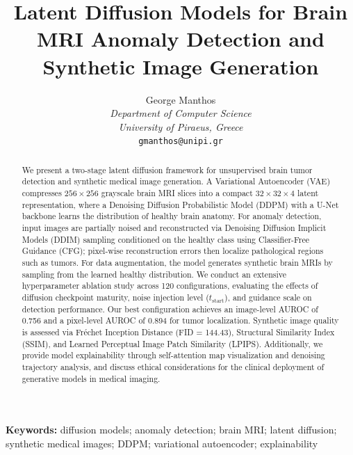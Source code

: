 \documentclass[12pt,a4paper]{article}
\title{\textbf{Latent Diffusion Models for Brain MRI Anomaly Detection and Synthetic Image Generation}}
\author{
  George Manthos \\
  \textit{Department of Computer Science} \\
  \textit{University of Piraeus, Greece} \\
  \texttt{gmanthos@unipi.gr}
}
\date{}
\begin{document}
\maketitle

\begin{abstract}
\noindent
We present a two-stage latent diffusion framework for unsupervised brain tumor detection and synthetic medical image generation. A Variational Autoencoder (VAE) compresses $256 \times 256$ grayscale brain MRI slices into a compact $32 \times 32 \times 4$ latent representation, where a Denoising Diffusion Probabilistic Model (DDPM) with a U-Net backbone learns the distribution of healthy brain anatomy. For anomaly detection, input images are partially noised and reconstructed via Denoising Diffusion Implicit Models (DDIM) sampling conditioned on the healthy class using Classifier-Free Guidance (CFG); pixel-wise reconstruction errors then localize pathological regions such as tumors. For data augmentation, the model generates synthetic brain MRIs by sampling from the learned healthy distribution. We conduct an extensive hyperparameter ablation study across 120 configurations, evaluating the effects of diffusion checkpoint maturity, noise injection level ($t_\text{start}$), and guidance scale on detection performance. Our best configuration achieves an image-level AUROC of 0.756 and a pixel-level AUROC of 0.894 for tumor localization. Synthetic image quality is assessed via Fr\'{e}chet Inception Distance (FID = 144.43), Structural Similarity Index (SSIM), and Learned Perceptual Image Patch Similarity (LPIPS). Additionally, we provide model explainability through self-attention map visualization and denoising trajectory analysis, and discuss ethical considerations for the clinical deployment of generative models in medical imaging.
\end{abstract}

\noindent\textbf{Keywords:} diffusion models; anomaly detection; brain MRI; latent diffusion; synthetic medical images; DDPM; variational autoencoder; explainability

\vspace{1em}
\end{document}
